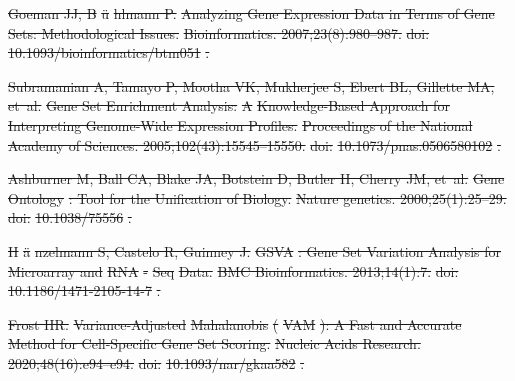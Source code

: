 \documentclass[10pt,letterpaper]{article}
\providecommand{\DIFdeltex}[1]{{\protect\color{red}\sout{#1}}}                      %
\providecommand{\DIFdel}[1]{\texorpdfstring{\DIFdeltex{#1}}{}} %
\begin{document}
\DIFdel{Goeman JJ, B}%
\DIFdel{\"u}%
\DIFdel{hlmann P.
}%
\DIFdel{Analyzing Gene Expression Data in Terms of Gene Sets: Methodological
  Issues.
}%
\DIFdel{Bioinformatics. 2007;23(8):980--987.
}%
\DIFdel{doi:}%
\DIFdel{10.1093/bioinformatics/btm051}%
\DIFdel{.
}%

\DIFdel{Subramanian A, Tamayo P, Mootha VK, Mukherjee S, Ebert BL, Gillette MA, et~al.
}%
\DIFdel{Gene Set Enrichment Analysis: }%
\DIFdel{A}%
\DIFdel{Knowledge-Based Approach for
  Interpreting Genome-Wide Expression Profiles.
}%
\DIFdel{Proceedings of the National Academy of Sciences.
  2005;102(43):15545--15550.
}%
\DIFdel{doi:}%
\DIFdel{10.1073/pnas.0506580102}%
\DIFdel{.
}%

\DIFdel{Ashburner M, Ball CA, Blake JA, Botstein D, Butler H, Cherry JM, et~al.
}%
\DIFdel{Gene }%
\DIFdel{Ontology}%
\DIFdel{: Tool for the Unification of Biology.
}%
\DIFdel{Nature genetics. 2000;25(1):25--29.
}%
\DIFdel{doi:}%
\DIFdel{10.1038/75556}%
\DIFdel{.
}%

\DIFdel{H}%
\DIFdel{\"a}%
\DIFdel{nzelmann S, Castelo R, Guinney J.
}%
\DIFdel{GSVA}%
\DIFdel{: Gene Set Variation Analysis for Microarray and
  }%
\DIFdel{RNA}%
\DIFdel{-}%
\DIFdel{Seq}%
\DIFdel{Data.
}%
\DIFdel{BMC Bioinformatics. 2013;14(1):7.
}%
\DIFdel{doi:}%
\DIFdel{10.1186/1471-2105-14-7}%
\DIFdel{.
}%

\DIFdel{Frost HR.
}%
\DIFdel{Variance-Adjusted }%
\DIFdel{Mahalanobis}%
\DIFdel{(}%
\DIFdel{VAM}%
\DIFdel{): A Fast and Accurate
  Method for Cell-Specific Gene Set Scoring.
}%
\DIFdel{Nucleic Acids Research. 2020;48(16):e94--e94.
}%
\DIFdel{doi:}%
\DIFdel{10.1093/nar/gkaa582}%
\DIFdel{.
}%
\end{document}
